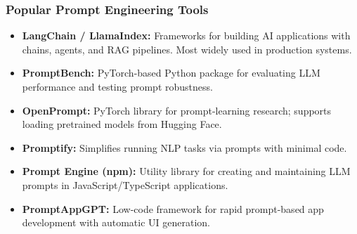 \begin{frame}[fragile]\frametitle{Popular Prompt Engineering Tools}
  \begin{itemize}
    \item \textbf{LangChain / LlamaIndex:} Frameworks for building AI applications with chains, agents, and RAG pipelines. Most widely used in production systems.
    \item \textbf{PromptBench:} PyTorch-based Python package for evaluating LLM performance and testing prompt robustness.
    \item \textbf{OpenPrompt:} PyTorch library for prompt-learning research; supports loading pretrained models from Hugging Face.
    \item \textbf{Promptify:} Simplifies running NLP tasks via prompts with minimal code.
    \item \textbf{Prompt Engine (npm):} Utility library for creating and maintaining LLM prompts in JavaScript/TypeScript applications.
    \item \textbf{PromptAppGPT:} Low-code framework for rapid prompt-based app development with automatic UI generation.
  \end{itemize}
\end{frame}


